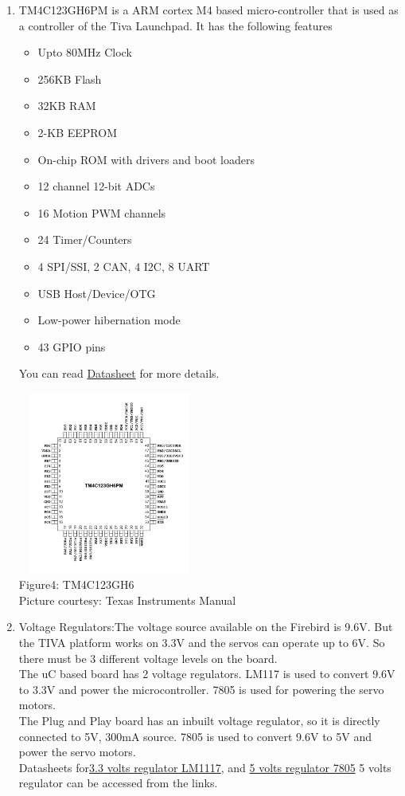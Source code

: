 \documentclass[a4paper,12pt,oneside]{book}
\begin{document}
\begin{itemize}
\begin{enumerate}
	\item TM4C123GH6PM is a ARM cortex M4 based micro-controller that is used as a controller of the Tiva Launchpad. It has the following features
		\begin{itemize} 
			\item Upto 80MHz Clock 
			\item 256KB Flash
			\item 32KB RAM
			\item 2-KB EEPROM
			\item On-chip ROM with drivers and boot loaders
			\item 12 channel 12-bit ADCs 
			\item 16 Motion PWM channels
			\item 24 Timer/Counters
			\item 4 SPI/SSI, 2 CAN, 4 I2C, 8 UART
			\item USB Host/Device/OTG
			\item Low-power hibernation mode
			\item 43 GPIO pins
		\end{itemize}	
	 You can read \href{./datasheet/tm4c123gh6pm.pdf}{Datasheet} for more details.
	 \begin{center}
	 	\includegraphics[width=6cm, height=6cm]{Images/TM4C123G}\\
	 	Figure4: TM4C123GH6\\
	 	Picture courtesy: Texas Instruments Manual
	 \end{center}
	
	\item Voltage Regulators:The voltage source available on the Firebird is 9.6V. But the TIVA platform works on 3.3V and the servos can operate up to 6V. So there must be 3 different voltage levels on the board.\\
	The uC based board has 2 voltage regulators. LM117 is used to convert 9.6V to 3.3V and power the microcontroller. 7805 is used for powering the servo motors.\\
	The Plug and Play board has an inbuilt voltage regulator, so it is directly connected to 5V, 300mA source. 7805 is used to convert 9.6V to 5V and power the servo motors.\\
	Datasheets for\href{./datasheet/lm1117.pdf}{3.3 volts regulator LM1117}, and \href{./datasheet/LM7805.pdf}{ 5 volts regulator 7805} 5 volts regulator can be accessed from the links.
	

\end{enumerate}
\end{itemize}
\end{document}
